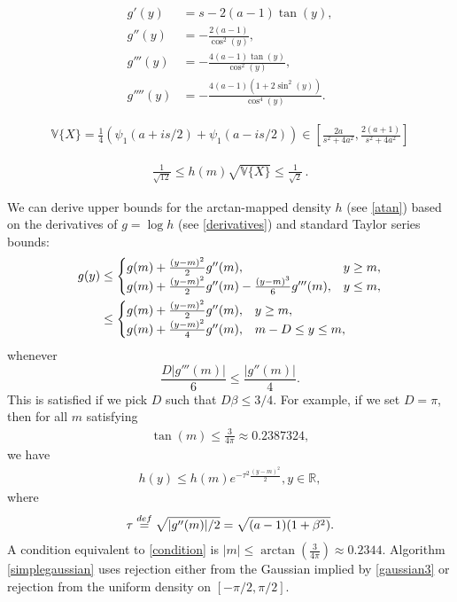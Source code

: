 \documentclass[10pt,a4paper]{amsart}
\newcommand{\RR}{\mathbb{R}}
\newcommand{\Var}{\mathbb{V}}
\newcommand{\isdef}{\buildrel {\rm def} \over =}
\begin{document}
\begin{align}\label{derivatives}
g' (y) &= s - 2(a-1) \tan (y) ,\\
g'' (y) &= - \frac{2 (a-1)} {\cos^2 (y)}, \\
g''' (y) &= - \frac{4 (a-1) \tan (y)} {\cos^2 (y)} ,\\
g'''' (y) &= - \frac{4 (a-1) ( 1 + 2 \sin^2 (y)) } {\cos^4 (y)}.
\end{align}

\begin{align}\label{variance}
\Var \{ X \} 
= \frac{1}{4} \left( \psi_1 (a+ is/2) + \psi_1 (a- is/2) \right)
\in \left[ \frac{2a}{s^2 + 4a^2} , \frac{2(a+1)}{s^2 + 4a^2}\right]
\end{align}

\begin{align}\label{fradelizi}
\frac{1}{\sqrt{12} } \le h(m)\sqrt{\Var\{X\}} \le \frac{1}{\sqrt{2}}\,.
\end{align}

We can derive upper bounds for the arctan-mapped density $h$ (see \eqref{atan}) based on
the derivatives of $g=\log h$ (see \eqref{derivatives}) and standard Taylor series bounds:
\begin{align}
g(y) 
&\le 
\begin{cases}
g(m) + \frac{(y-m)^2}{2} g''(m), & y \ge m , \cr
g(m) + \frac{(y-m)^2}{2} g''(m) - \frac{(y-m)^3}{6} g'''(m), & y \le m, \cr
\end{cases}  \\
&\le 
\begin{cases}
g(m) + \frac{(y-m)^2}{2} g''(m), & y \ge m , \cr
g(m) + \frac{(y-m)^2}{4} g''(m),  & m - D \le y \le m, \cr
\end{cases}\label{gaussian2}
\end{align}
whenever 
$$
\frac {D |g'''(m)|}{6} \le \frac{ |g''(m)|}{4}.
$$
This is satisfied if we pick $D$ such that $D \beta \le 3/4$.
For example, if we set $D=\pi$, then for all $m$ satisfying
\begin{align}\label{condition}
\tan (m) \le \frac{3}{4 \pi} \approx 0.2387324,
\end{align}
we have
\begin{align}\label{gaussian3}
h(y) \le 
h(m) e^{-\tau^2 \frac{(y-m)^2}{2}}, y \in \RR,
\end{align}
where
\begin{align*}
\tau \isdef \sqrt {|g''(m)|/2} = \sqrt{(a-1)(1+\beta^2)}.
\end{align*}
A condition equivalent to \eqref{condition}
is $|m| \le \arctan \left( \frac{3}{4\pi} \right) \approx 0.2344$. 
Algorithm  \ref{simplegaussian} uses rejection either from the Gaussian implied by \eqref{gaussian3} or rejection from the uniform density on $[-\pi/2,\pi/2]$.
\end{document}
